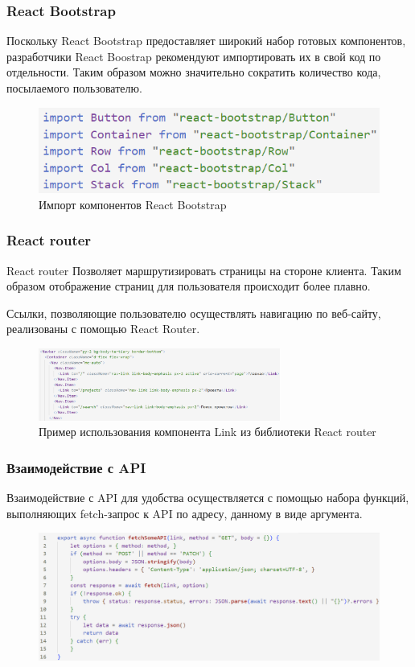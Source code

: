 \documentclass[hyperref={unicode}]{beamer}
\begin{document}
\begin{frame}
	\frametitle{React Bootstrap}
	Поскольку React Bootstrap предоставляет широкий набор готовых компонентов, разработчики React Boostrap рекомендуют импортировать их в свой код по отдельности. Таким образом можно значительно сократить количество кода, посылаемого пользователю.
	\begin{figure}
	\includegraphics{images/bootstrapimport.png}
	\caption{Импорт компонентов React Bootstrap}
	\end{figure}
\end{frame}

\begin{frame}
	\frametitle{React router}
	\begin{block}{React router}
	Позволяет маршрутизировать страницы на стороне клиента. Таким образом отображение страниц для пользователя происходит более плавно.
	\end{block}
	Ссылки, позволяющие пользователю осуществлять навигацию по веб-сайту, реализованы с помощью React Router.
	\begin{figure}
	\includegraphics[width=300px]{images/reactrouter.png}
	\caption{Пример использования компонента Link из библиотеки React router}
	\end{figure}
\end{frame}

\begin{frame}
	\frametitle{Взаимодействие с API}
	Взаимодействие с API для удобства осуществляется с помощью набора функций, выполняющих fetch-запрос к API по адресу, данному в виде аргумента.
	\begin{figure}
	\includegraphics[width=\textwidth]{images/fetch.png}
	\end{figure}
\end{frame}
\end{document}
